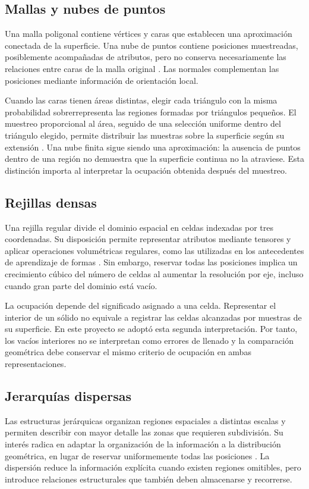 \subsection{Mallas y nubes de puntos}
Una malla poligonal contiene vértices y caras que establecen una aproximación conectada de la superficie. Una nube de puntos contiene posiciones muestreadas, posiblemente acompañadas de atributos, pero no conserva necesariamente las relaciones entre caras de la malla original \parencite{guo2021}. Las normales complementan las posiciones mediante información de orientación local.

Cuando las caras tienen áreas distintas, elegir cada triángulo con la misma probabilidad sobrerrepresenta las regiones formadas por triángulos pequeños. El muestreo proporcional al área, seguido de una selección uniforme dentro del triángulo elegido, permite distribuir las muestras sobre la superficie según su extensión \parencite{pbrt}. Una nube finita sigue siendo una aproximación: la ausencia de puntos dentro de una región no demuestra que la superficie continua no la atraviese. Esta distinción importa al interpretar la ocupación obtenida después del muestreo.

\subsection{Rejillas densas}
Una rejilla regular divide el dominio espacial en celdas indexadas por tres coordenadas. Su disposición permite representar atributos mediante tensores y aplicar operaciones volumétricas regulares, como las utilizadas en los antecedentes de aprendizaje de formas \parencite{wu2015}. Sin embargo, reservar todas las posiciones implica un crecimiento cúbico del número de celdas al aumentar la resolución por eje, incluso cuando gran parte del dominio está vacío.

La ocupación depende del significado asignado a una celda. Representar el interior de un sólido no equivale a registrar las celdas alcanzadas por muestras de su superficie. En este proyecto se adoptó esta segunda interpretación. Por tanto, los vacíos interiores no se interpretan como errores de llenado y la comparación geométrica debe conservar el mismo criterio de ocupación en ambas representaciones.

\subsection{Jerarquías dispersas}
Las estructuras jerárquicas organizan regiones espaciales a distintas escalas y permiten describir con mayor detalle las zonas que requieren subdivisión. Su interés radica en adaptar la organización de la información a la distribución geométrica, en lugar de reservar uniformemente todas las posiciones \parencite{samet}. La dispersión reduce la información explícita cuando existen regiones omitibles, pero introduce relaciones estructurales que también deben almacenarse y recorrerse.

